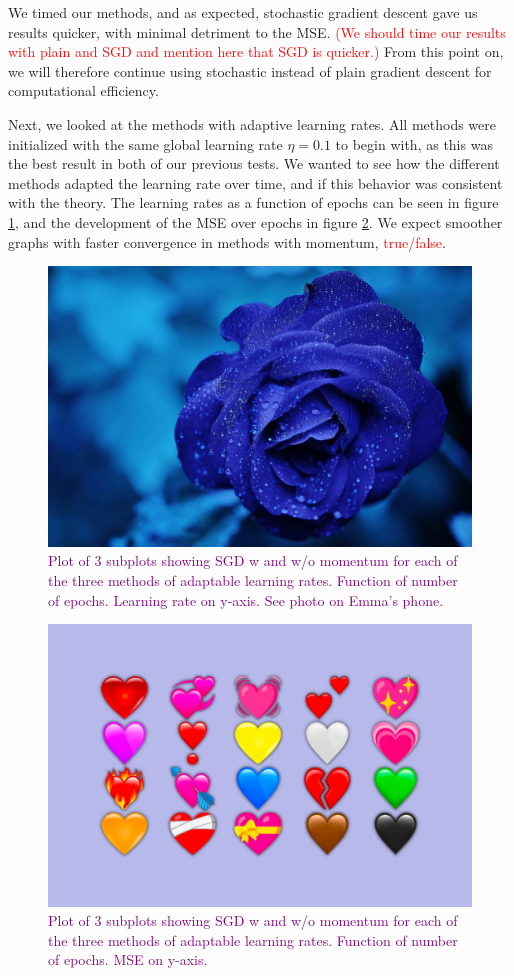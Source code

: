 We timed our methods, and as expected, stochastic gradient descent gave us results quicker, with minimal detriment to the MSE. \textcolor{red}{(We should time our results with plain and SGD and mention here that SGD is quicker.)} From this point on, we will therefore continue using stochastic instead of plain gradient descent for computational efficiency.

Next, we looked at the methods with adaptive learning rates. All methods were initialized with the same global learning rate $\eta = 0.1$ to begin with, as this was the best result in both of our previous tests. We wanted to see how the different methods adapted the learning rate over time, and if this behavior was consistent with the theory. The learning rates as a function of epochs can be seen in figure \ref{fig:learningratesGD}, and the development of the MSE over epochs in figure \ref{fig:MSEGD}. We expect smoother graphs with faster convergence in methods with momentum, \textcolor{red}{true/false}.
\begin{figure}
    \centering
    \includegraphics[width=0.5\linewidth]{figures/placeholders/learningratesGD.png}
    \caption{\textcolor{purple}{Plot of 3 subplots showing SGD w and w/o momentum for each of the three methods of adaptable learning rates.  Function of number of epochs. Learning rate on y-axis. See photo on Emma's phone.}}
    \label{fig:learningratesGD}
\end{figure}

\begin{figure}
    \centering
    \includegraphics[width=0.5\linewidth]{figures/placeholders/MSEGD.png}
    \caption{\textcolor{purple}{Plot of 3 subplots showing SGD w and w/o momentum for each of the three methods of adaptable learning rates.  Function of number of epochs. MSE on y-axis.}}
    \label{fig:MSEGD}
\end{figure}

